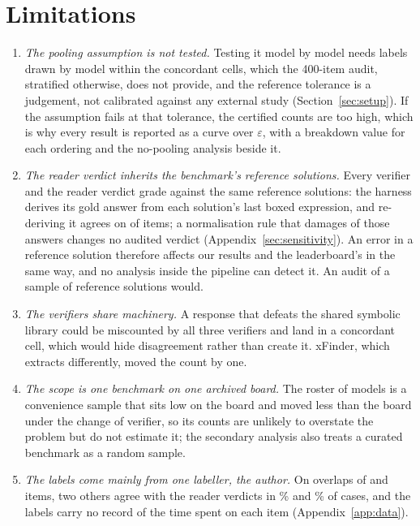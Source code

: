 \section{Limitations}
\label{sec:limitations}

\begin{enumerate}
\item \emph{The pooling assumption is not tested.} Testing it model by model needs labels drawn
  by model within the concordant cells, which the 400-item audit, stratified otherwise, does not
  provide, and the reference tolerance is a judgement, not calibrated against any external study
  (Section~\ref{sec:setup}). If the
  assumption fails at that tolerance, the certified counts are too high, which is why every result
  is reported as a curve over $\varepsilon$, with a breakdown value for each ordering and the
  no-pooling analysis beside it.
\item \emph{The reader verdict inherits the benchmark's reference solutions.} Every verifier and
  the reader verdict grade against the same reference solutions: the harness derives its gold
  answer from each solution's last boxed expression, and re-deriving it agrees on
  \GoldConsistentN{} of \NumItems{} items; a normalisation rule that damages \GoldFtItems{} of those
  answers changes no audited verdict (Appendix~\ref{sec:sensitivity}). An error in a reference solution therefore affects our
  results and the leaderboard's in the same way, and no analysis inside the pipeline can detect it.
  An audit of a sample of reference solutions would.
\item \emph{The verifiers share machinery.} A response that defeats the shared symbolic library
  could be miscounted by all three verifiers and land in a concordant cell, which would hide
  disagreement rather than create it. xFinder, which extracts differently, moved the count by one.
\item \emph{The scope is one benchmark on one archived board.} The roster of \NumModels{} models
  is a convenience sample that sits low on the board and moved less than the board under the
  change of verifier, so its counts are unlikely to overstate the problem but do not estimate it;
  the secondary analysis also treats a curated benchmark as a random sample.
\item \emph{The labels come mainly from one labeller, the author.} On overlaps of \LabTwoN{} and
  \LabThreeN{} items, two others agree with the reader verdicts in \LabTwoPct\% and \LabThreePct\%
  of cases, and the labels carry no record of the time spent on each item (Appendix~\ref{app:data}).
\end{enumerate}

